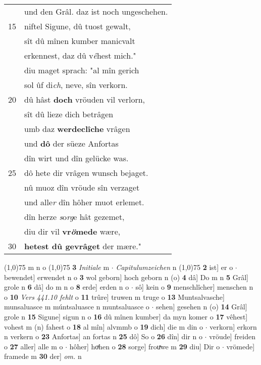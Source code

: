 \documentclass[8pt,a4paper,notitlepage]{article}
\begin{document}
\begin{table}[ht]
\begin{minipage}[t]{0.5\linewidth}
\begin{tabular}{rl}
 & und den Grâl. daz ist noch ungeschehen.\\ 
15 & niftel Sigune, dû tuost gewalt,\\ 
 & sît dû mînen kumber manicvalt\\ 
 & erkennest, daz dû v\textit{ê}hest mich."\\ 
 & diu maget sprach: "al mîn gerich\\ 
 & sol ûf di\textit{ch}, neve, sîn verkorn.\\ 
20 & dû hâst \textbf{doch} vröuden vil verlorn,\\ 
 & sît dû lieze dich betrâgen\\ 
 & umb daz \textbf{werdeclîche} vrâgen\\ 
 & und \textbf{dô} der süeze Anfortas\\ 
 & dîn wirt und dîn gelücke was.\\ 
25 & dô hete dir vrâgen wunsch bejaget.\\ 
 & nû muoz dîn vröude sîn verzaget\\ 
 & und alle\textit{r} dîn hôher muot erlemet.\\ 
 & dîn herze \textit{s}o\textit{rg}e hât gezemet,\\ 
 & diu dir vil \textbf{vr\textit{ö}mede} wære,\\ 
30 & \textbf{hetest dû gevrâget} der mære."\\ 
\end{tabular}
\scriptsize
\line(1,0){75} \newline
m n o \newline
\line(1,0){75} \newline
\textbf{3} \textit{Initiale} m   $\cdot$ \textit{Capitulumzeichen} n  \newline
\line(1,0){75} \newline
\textbf{2} ist] er o  $\cdot$ bewendet] erwendet n o \textbf{3} wol geborn] hoch geborn n (o) \textbf{4} dâ] Do m n \textbf{5} Grâl] grole n \textbf{6} dâ] do m n o \textbf{8} erde] erden n o  $\cdot$ sô] kein o \textbf{9} menschlîcher] menschen n o \textbf{10} \textit{Vers 441.10 fehlt} o  \textbf{11} trûre] truwen m truge o \textbf{13} Muntsalvasche] munsaluasce m múntsaluasce n muntsaluasce o  $\cdot$ sehen] gesehen n (o) \textbf{14} Grâl] grole n \textbf{15} Sigune] sigun n o \textbf{16} dû mînen kumber] da myn komer o \textbf{17} vêhest] vohest m (n) fahest o \textbf{18} al mîn] alvmmb o \textbf{19} dich] die m din o  $\cdot$ verkorn] erkorn n verkern o \textbf{23} Anfortas] an fortas n \textbf{25} dô] So o \textbf{26} dîn] dir n o  $\cdot$ vröude] freiden o \textbf{27} aller] alle m o  $\cdot$ hôher] hoͯhen o \textbf{28} sorge] frouͯwe m \textbf{29} diu] Dir o  $\cdot$ vrömede] framede m \textbf{30} der] \textit{om.} n \newline
\end{minipage}
\end{table}
\end{document}
